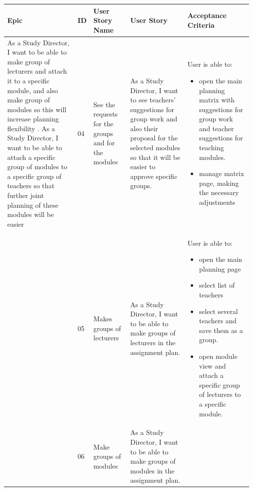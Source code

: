 \documentclass{scrartcl}
\begin{document}
\begin{table}[H]
\begin{center}
\begin{tabular}{|p{4cm}|p{0.5cm} |p{3cm}|p{4cm}|p{4cm}|}\hline
\rowcolor{LightCyan}
 \textbf{Epic} &\textbf{ ID} &\textbf{User Story Name} &\textbf{User Story}  & \textbf{Acceptance Criteria} \\
\hline
   
 As a Study Director, I want to be able to make group of lecturers and attach it to a specific module, and also make group of modules so this will increase planning flexibility . As a Study Director, I want to be able to attach a specific group of modules to a specific group of teachers so that further joint planning of these modules will be easier &
04 &
See the requests for the groups and for the modules &
As a Study Director, I want to see teachers' suggestions for group work and also their proposal for the selected modules so that it will be easier to approve specific groups. &
          
  User is able to:            
\begin{itemize}
\item open the main planning matrix with suggestions for group work and teacher suggestions for teaching modules.
\item manage matrix page, making the necessary adjustments

\end{itemize}                                                                 \\ \hline

 &
 05&
 Makes groups of lecturers&
 As a Study Director, I want to be able to make groups of lecturers in the assignment plan. &
 
   User is able to:            
\begin{itemize}
\item open the main planning page
\item select list of teachers
\item select several teachers and save them as a group.
\item open module view and attach a specific group of lecturers to a specific module.

\end{itemize}                                                                 \\ \hline

 &
 06&
 Make groups of modules&
 As a Study Director, I want to be able to make groups of modules in the assignment plan. &
 

\end{tabular}
\end{center}
\end{table}
\end{document}

